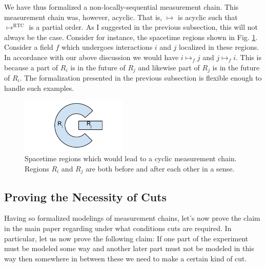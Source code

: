 \documentclass[prd,twocolumn,superscriptaddress,floatfix,amsmath,amssymb,amsfonts,nofootinbib]{revtex4-2}
\begin{document}
We have thus formalized a non-locally-sequential measurement chain. This measurement chain was, however, acyclic. That is, $\mapsto$ is acyclic such that $\mapsto^\text{RTC}$ is a partial order. As I suggested in the previous subsection, this will not always be the case. Consider for instance, the spacetime regions shown in Fig. \ref{FigCyclic}. Consider a field $f$ which undergoes interactions $i$ and $j$ localized in these regions. In accordance with our above discussion we would have $i\mapsto_f j$ and $j\mapsto_f i$. This is because a part of $R_i$ is in the future of $R_j$ and likewise part of $R_j$ is in the future of $R_i$. The formalization presented in the previous subsection is flexible enough to handle such examples. 

\begin{figure}
\includegraphics[width=0.45\textwidth]{Figures/CyclicDiagram.pdf}
\caption{Spacetime regions which would lead to a cyclic measurement chain. Regions $R_i$ and $R_j$ are both before and after each other in a sense.}\label{FigCyclic}
\end{figure}

\subsection{Proving the Necessity of Cuts} 
Having so formalized modelings of measurement chains, let's now prove the claim in the main paper regarding under what conditions cuts are required. In particular, let us now prove the following claim: If one part of the experiment must be modeled some way and another later part must not be modeled in this way then somewhere in between these we need to make a certain kind of cut. 
\end{document}

